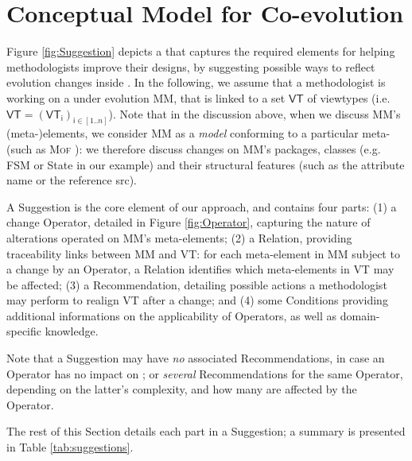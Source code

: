 \section{Conceptual Model for \Viewtype Co-evolution}

\label{sec:Suggestion}


Figure \ref{fig:Suggestion} depicts a \metamodel that captures the
required elements for helping methodologists improve their \viewtype designs,
by suggesting possible ways to reflect evolution changes inside \viewtypes.
In the following, we assume that a methodologist is working on a \metamodel
under evolution \textsf{MM}, that is linked to a set $\mathsf{VT}$ of viewtypes
(i.e. $\mathsf{VT} = (\mathsf{VT}_\mathsf{i})_{\mathsf{i}\in [1..n]}$). Note that in the discussion above, when we discuss
\textsf{MM}'s (meta-)elements, we consider \textsf{MM} as a \emph{model}
conforming to a particular meta-\metamodel (such as \textsc{Mof} \cite{TR:OMG-MOF:2016}):
we therefore discuss changes on \textsf{MM}'s packages, classes (e.g. 
\textsf{FSM} or \textsf{State} in our example) and their structural features
(such as the attribute \textsf{name} or the reference \textsf{src}).

A \textsf{Suggestion} is the core element of our approach, and contains four 
parts: (1) a change \textsf{Operator}, detailed in Figure \ref{fig:Operator}, capturing the nature of
alterations operated on \textsf{MM}'s meta-elements; 
    (2) a \textsf{Relation}, providing traceability links between \textsf{MM} 
		and \textsf{VT}: for each meta-element in \textsf{MM} subject to a 
		change by an \textsf{Operator}, a \textsf{Relation} identifies which 
		meta-elements in \textsf{VT} may be affected;
    (3) a \textsf{Recommendation}, detailing possible actions a methodologist 
		may perform to realign \textsf{VT} after a change;
		 and (4) some \textsf{Condition}s providing additional informations on the
		applicability of \textsf{Operator}s, as well as domain-specific knowledge.

Note that a \textsf{Suggestion} may 
have \emph{no} associated \textsf{Recommendation}s, in case an \textsf{Operator} has no
impact on \viewtypes; or \emph{several} \textsf{Recommendation}s for the same 
\textsf{Operator}, depending on the latter's complexity, and how 
many \viewtypes are affected by the \textsf{Operator}.

The rest of this Section details each part in a \textsf{Suggestion}; a summary
is presented in Table \ref{tab:suggestions}.






